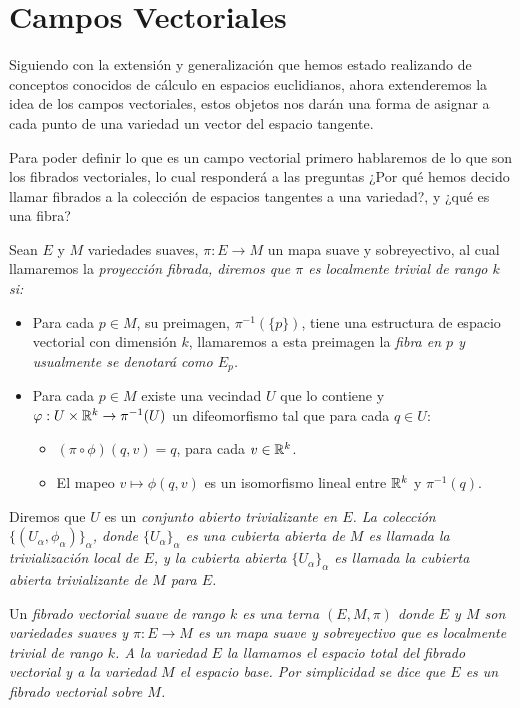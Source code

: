\section{Campos Vectoriales}\label{Sección: Campos Vectoriales}
Siguiendo con la extensión y generalización que hemos estado realizando de conceptos conocidos de cálculo en espacios euclidianos, ahora extenderemos la idea de los campos vectoriales, estos objetos nos darán una forma de asignar a cada punto de una variedad un vector del espacio tangente.

Para poder definir lo que es un campo vectorial primero hablaremos de lo que son los fibrados vectoriales, lo cual responderá a las preguntas ¿Por qué hemos decido llamar fibrados a la colección de espacios tangentes a una variedad?, y ¿qué es una fibra?

\begin{definition}
 Sean $E$ y $M$ variedades suaves, $\pi: E \to M$ un mapa suave y sobreyectivo, al cual llamaremos la \it{proyección fibrada}, diremos que $\pi$ es \it{localmente trivial de rango $k$} si:
 
\begin{itemize}
\item Para cada $p \in M$, su preimagen, $\pi^{-1}(\{p\})$, tiene una estructura de espacio vectorial con dimensión $k$, llamaremos a esta preimagen la \it{fibra en $p$} y usualmente se denotará como $E_p$.

\item Para cada $p \in M$ existe una vecindad $U$ que lo contiene y $\varphi: U \times \mathbb{R}^{k} \to \pi^{-1}(U)$ un difeomorfismo tal que para cada $q \in U$:
\begin{itemize}
    \item $(\pi \circ \phi)(q,v) = q$, para cada $v \in \mathbb{R}^{k}$.
    \item El mapeo $v \mapsto \phi(q,v)$ es un isomorfismo lineal entre $\mathbb{R}^{k}$ y $\pi^{-1}(q)$.
\end{itemize}
\end{itemize}

  Diremos que $U$ es un \it{conjunto abierto trivializante} en $E$. La colección $\{(U_\alpha, \phi_\alpha)\}_{\alpha}$, donde $\{U_{\alpha}\}_{\alpha}$ es una cubierta abierta de $M$ es llamada la trivialización local de $E$, y la cubierta abierta $\{U_\alpha\}_{\alpha}$ es llamada la cubierta abierta trivializante de $M$ para $E$.

  Un \it{fibrado vectorial suave de rango $k$} es una terna $(E,M,\pi)$ donde $E$ y $M$ son variedades suaves y $\pi: E \to M$ es un mapa suave y sobreyectivo que es localmente trivial de rango $k$. A la variedad $E$ la llamamos el \it{espacio total} del fibrado vectorial y a la variedad $M$ el \it{espacio base}. Por simplicidad se dice que $E$ es un fibrado vectorial sobre $M$.
\end{definition}

